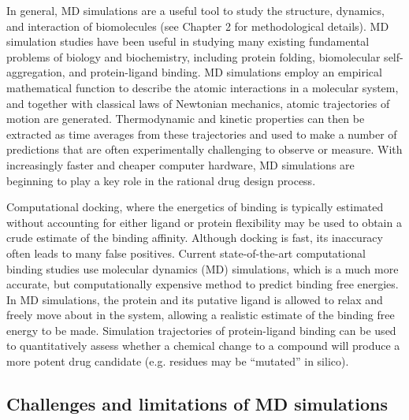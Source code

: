 In general, MD simulations are a useful tool to study the structure, dynamics, and interaction of biomolecules (see Chapter 2 for methodological details).  MD simulation studies have been useful in studying many existing fundamental problems of biology and biochemistry, including protein folding, biomolecular self-aggregation, and protein-ligand binding.  MD simulations employ an empirical mathematical function to describe the atomic interactions in a molecular system, and together with classical laws of Newtonian mechanics, atomic trajectories of motion are generated.  Thermodynamic and kinetic properties can then be extracted as time averages from these trajectories and used to make a number of predictions that are often experimentally challenging to observe or measure.  With increasingly faster and cheaper computer hardware, MD simulations are beginning to play a key role in the rational drug design process. 

Computational docking, where the energetics of binding is typically estimated without accounting for either ligand or protein flexibility may be used to obtain a crude estimate of the binding affinity.  Although docking is fast, its inaccuracy often leads to many false positives.  Current state-of-the-art computational binding studies use molecular dynamics (MD) simulations, which is a much more accurate, but computationally expensive method to predict binding free energies.   In MD simulations, the protein and its putative ligand is allowed to relax and freely move about in the system, allowing a realistic estimate of the binding free energy to be made. Simulation trajectories of protein-ligand binding can be used to quantitatively assess whether a chemical change to a compound will produce a more potent drug candidate (e.g.  residues may be ``mutated'' in silico).


\subsection{Challenges and limitations of MD simulations}

